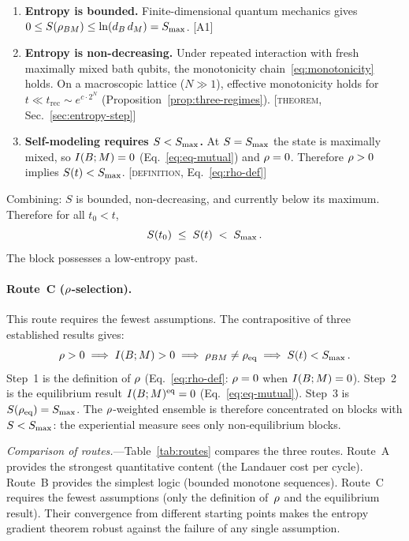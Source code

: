 \begin{enumerate}
  \item \textbf{Entropy is bounded.}
    Finite-dimensional quantum mechanics gives
    $0 \leq S(\rho_{BM}) \leq \ln(d_B\,d_M) = S_{\max}$.
    \hfill[A1]

  \item \textbf{Entropy is non-decreasing.}
    Under repeated interaction with fresh maximally mixed bath qubits,
    the monotonicity chain~\eqref{eq:monotonicity} holds.  On a
    macroscopic lattice ($N \gg 1$), effective monotonicity holds for
    $t \ll t_{\mathrm{rec}} \sim e^{c\cdot 2^N}$
    (Proposition~\ref{prop:three-regimes}).
    \hfill[\textsc{theorem}, Sec.~\ref{sec:entropy-step}]

  \item \textbf{Self-modeling requires $S < S_{\max}$.}
    At $S = S_{\max}$ the state is maximally mixed, so $I(B;M) = 0$
    (Eq.~\eqref{eq:eq-mutual}) and $\rho = 0$.  Therefore
    $\rho > 0$ implies $S(t) < S_{\max}$.
    \hfill[\textsc{definition}, Eq.~\eqref{eq:rho-def}]
\end{enumerate}
Combining: $S$ is bounded, non-decreasing, and currently below its
maximum.  Therefore for all $t_0 < t$,
\begin{equation}
  S(t_0) \;\leq\; S(t) \;<\; S_{\max} \,.
  \label{eq:route-b}
\end{equation}
The block possesses a low-entropy past.

\paragraph{Route~C ($\rho$-selection).}
This route requires the fewest assumptions.  The contrapositive of
three established results gives:
\begin{equation}
  \rho > 0
  \;\Longrightarrow\;
  I(B;M) > 0
  \;\Longrightarrow\;
  \rho_{BM} \neq \rho_{\mathrm{eq}}
  \;\Longrightarrow\;
  S(t) < S_{\max} \,.
  \label{eq:route-c}
\end{equation}
Step~1 is the definition of $\rho$
(Eq.~\eqref{eq:rho-def}: $\rho = 0$ when $I(B;M) = 0$).
Step~2 is the equilibrium result $I(B;M)^{\mathrm{eq}} = 0$
(Eq.~\eqref{eq:eq-mutual}).  Step~3 is
$S(\rho_{\mathrm{eq}}) = S_{\max}$.  The $\rho$-weighted ensemble is
therefore concentrated on blocks with $S < S_{\max}$: the experiential
measure sees only non-equilibrium blocks.

\medskip
\noindent
\textit{Comparison of routes.}---Table~\ref{tab:routes} compares the
three routes.  Route~A provides the strongest quantitative content
(the Landauer cost per cycle).  Route~B provides the simplest logic
(bounded monotone sequences).  Route~C requires the fewest
assumptions (only the definition of~$\rho$ and the equilibrium
result).  Their convergence from different starting points makes the
entropy gradient theorem robust against the failure of any single
assumption.

